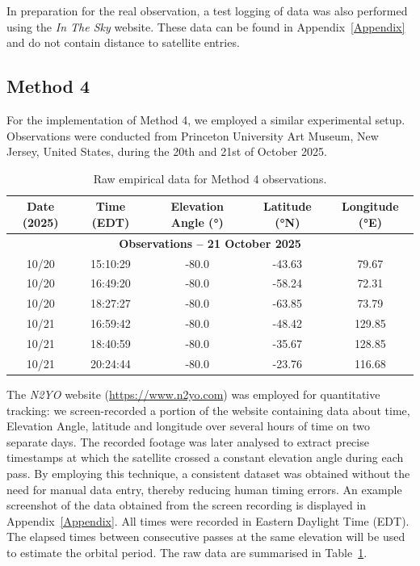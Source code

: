 \documentclass{article}
\begin{document}
In preparation for the real observation, a test logging of data was also performed using the \textit{In The Sky} website. These data can be found in Appendix~\ref{Appendix} and do not contain distance to satellite entries.

\subsection{Method 4}

For the implementation of Method 4, we employed a similar experimental setup. Observations were conducted from Princeton University Art Museum, New Jersey, United States, during the 20th and 21st of October 2025.

\begin{table}[H]
    \centering
    \caption{Raw empirical data for Method 4 observations.}
    \label{tab:method4_data}
    \renewcommand{\arraystretch}{1.2}
    \begin{tabular}{|c|c|c|c|c|}
        \hline
        \textbf{Date (2025)} & \textbf{Time (EDT)} & \textbf{Elevation Angle (°)} & \textbf{Latitude (°N)} & \textbf{Longitude (°E)} \\ \hline
        \multicolumn{5}{|c|}{\textbf{Observations – 21 October 2025}} \\ \hline
        10/20 & 15:10:29 & -80.0 & -43.63 & 79.67\\ \hline
        10/20 & 16:49:20 & -80.0 & -58.24 & 72.31\\ \hline
        10/20 & 18:27:27 & -80.0 & -63.85 & 73.79\\ \hline
        10/21 & 16:59:42 & -80.0 & -48.42 & 129.85\\ \hline
        10/21 & 18:40:59 & -80.0 & -35.67 & 128.85\\ \hline
        10/21 & 20:24:44 & -80.0 & -23.76 & 116.68 \\ \hline
    \end{tabular}
\end{table}


 The \textit{N2YO} website (\href{https://www.n2yo.com}{https://www.n2yo.com}) was employed for quantitative tracking: we screen-recorded a portion of the website containing data about time, Elevation Angle, latitude and longitude over several hours of time on two separate days. The recorded footage was later analysed to extract precise timestamps at which the satellite crossed a constant elevation angle during each pass. By employing this technique, a consistent dataset was obtained without the need for manual data entry, thereby reducing human timing errors. An example screenshot of the data obtained from the screen recording is displayed in Appendix~\ref{Appendix}. All times were recorded in Eastern Daylight Time (EDT). The elapsed times between consecutive passes at the same elevation will be used to estimate the orbital period. The raw data are summarised in Table~\ref{tab:method4_data}.
\end{document}
